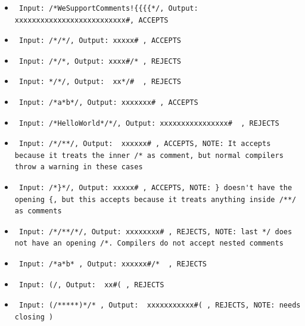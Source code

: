 \documentclass{article}
\begin{document}
{{\begin{itemize}
    \item \begin{verbatim} Input: /*WeSupportComments!{{{{*/, Output: xxxxxxxxxxxxxxxxxxxxxxxxxx#, ACCEPTS \end{verbatim}
    \item \begin{verbatim} Input: /*/*/, Output: xxxxx# , ACCEPTS \end{verbatim}  
    \item \begin{verbatim} Input: /*/*, Output: xxxx#/* , REJECTS \end{verbatim}
    \item \begin{verbatim} Input: */*/, Output:  xx*/#  , REJECTS \end{verbatim}
    \item \begin{verbatim} Input: /*a*b*/, Output: xxxxxxx# , ACCEPTS \end{verbatim}
    \item \begin{verbatim} Input: /*HelloWorld*/*/, Output: xxxxxxxxxxxxxxxx#  , REJECTS \end{verbatim}
    \item \begin{verbatim} Input: /*/**/, Output:  xxxxxx# , ACCEPTS, NOTE: It accepts because it treats the inner /* as comment, but normal compilers throw a warning in these cases \end{verbatim} 
    \item \begin{verbatim} Input: /*}*/, Output: xxxxx# , ACCEPTS, NOTE: } doesn't have the opening {, but this accepts because it treats anything inside /**/ as comments \end{verbatim}
    \item \begin{verbatim} Input: /*/**/*/, Output: xxxxxxxx# , REJECTS, NOTE: last */ does not have an opening /*. Compilers do not accept nested comments \end{verbatim}
    \item \begin{verbatim} Input: /*a*b* , Output: xxxxxx#/*  , REJECTS \end{verbatim}
    \item \begin{verbatim} Input: (/, Output:  xx#( , REJECTS \end{verbatim} 
    \item \begin{verbatim} Input: (/*****)*/* , Output:  xxxxxxxxxxx#( , REJECTS, NOTE: needs closing ) \end{verbatim}

\end{itemize}}}
\end{document}
